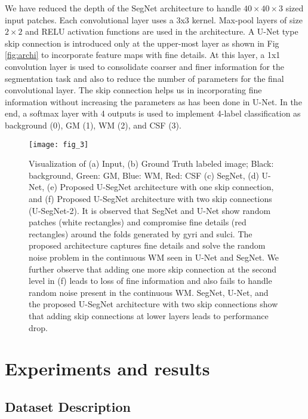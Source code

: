 \documentclass{article}
\begin{document}
We have reduced the depth of the SegNet architecture to handle $40 \times 40 \times 3$ sized input patches. Each convolutional layer uses a 3x3 kernel. Max-pool layers of size $2 \times 2$ and RELU activation functions are used in the architecture. A U-Net type skip connection is introduced only at the upper-most layer as shown in Fig \ref{fig:archi} to incorporate feature maps with fine details. At this layer, a 1x1 convolution layer is used to consolidate coarser and finer information for the segmentation task and also to reduce the number of parameters for the final convolutional layer. The skip connection helps us in incorporating fine information without increasing the parameters as has been done in U-Net. In the end, a softmax layer with 4 outputs is used to implement 4-label classification as background (0), GM (1), WM (2), and CSF (3).

\begin{figure*}[t]
	\begin{center}		\texttt{[image: fig\_3]}
		\end{center}
	\vspace{-2em}
	\caption{Visualization of (a) Input, (b) Ground Truth labeled image; Black: background, Green: GM, Blue: WM, Red: CSF (c) SegNet, (d) U-Net, (e) Proposed U-SegNet architecture with one skip connection, and (f) Proposed U-SegNet architecture with two skip connections (U-SegNet-2). It is observed that SegNet and U-Net show random patches (white rectangles) and compromise fine details (red rectangles) around the folds generated by gyri and sulci. The proposed architecture captures fine details and solve the random noise problem in the continuous WM seen in U-Net and SegNet. We further observe that adding one more skip connection at the second level in (f) leads to loss of fine information and also fails to handle random noise present in the continuous WM. SegNet, U-Net, and the proposed U-SegNet architecture with two skip connections show that adding skip connections at lower layers leads to performance drop.}
\label{fig:all_brain}
\end{figure*}

\section{Experiments and results}

\subsection{Dataset Description}
\end{document}
